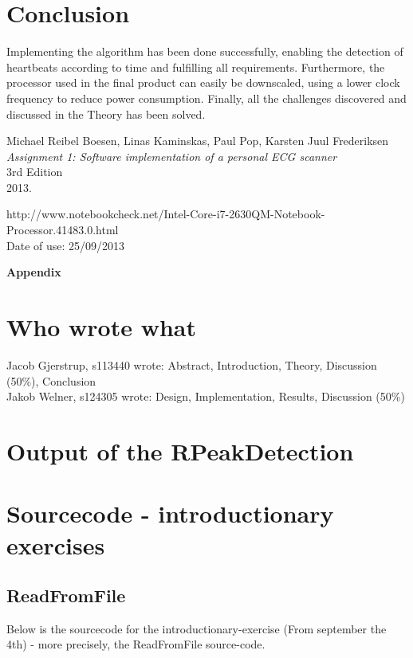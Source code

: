 \documentclass[12pt,a4paper]{article}
\begin{document}
\section{Conclusion}
	Implementing the algorithm has been done successfully, enabling the detection of heartbeats according to time and fulfilling all requirements. Furthermore, the processor  used in the final product can easily be downscaled, using a lower clock frequency to reduce power consumption. Finally, all the challenges discovered and discussed in the Theory has been solved.
\newpage
\begin{thebibliography}{9}

  Michael Reibel Boesen, Linas Kaminskas, Paul Pop, Karsten Juul Frederiksen\\
  \emph{Assignment 1: Software implementation of a personal ECG scanner}\\
  3rd Edition\\
  2013.

	http://www.notebookcheck.net/Intel-Core-i7-2630QM-Notebook-Processor.41483.0.html\\
	Date of use: 25/09/2013
\end{thebibliography}
	
\newpage	
	\begin{Large}
		\textbf{Appendix}
	\end{Large}
	\appendix

\section{Who wrote what}
Jacob Gjerstrup, s113440 wrote: Abstract, Introduction, Theory, Discussion (50\%), Conclusion\\
Jakob Welner, s124305 wrote: Design, Implementation, Results, Discussion (50\%)\\

\section{Output of the RPeakDetection}
\label{output}
	

	
\section{Sourcecode - introductionary exercises}
\subsection{ReadFromFile}
	Below is the sourcecode for the introductionary-exercise (From september the 4th) - more precisely, the ReadFromFile source-code.\\
	\\
	
\end{document}

